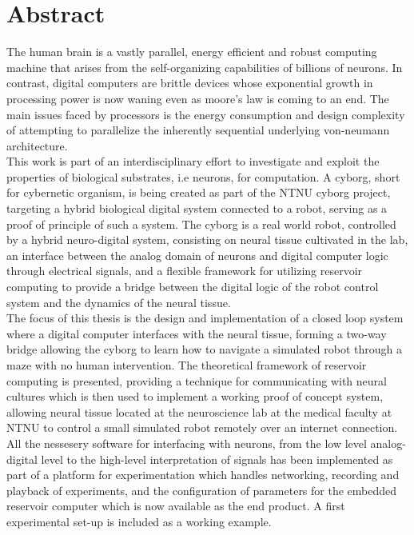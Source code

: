 \section*{\Huge Abstract}
The human brain is a vastly parallel, energy efficient and robust computing
machine that arises from the self-organizing capabilities of billions of neurons.
In contrast, digital computers are brittle devices whose exponential growth in
processing power is now waning even as moore's law is coming to an end.
The main issues faced by processors is the energy consumption and design
complexity of attempting to parallelize the inherently sequential underlying
von-neumann architecture.\\
This work is part of an interdisciplinary effort to investigate and exploit the
properties of biological substrates, i.e neurons, for computation.
%
A cyborg, short for cybernetic organism, is being created as part of the NTNU
cyborg project, targeting a hybrid biological digital system connected to a
robot, serving as a proof of principle of such a system.
%
The cyborg is a real world robot, controlled by a hybrid neuro-digital system,
consisting on neural tissue cultivated in the lab, an interface between the
analog domain of neurons and digital computer logic through electrical signals,
and a flexible framework for utilizing reservoir computing to provide a bridge
between the digital logic of the robot control system and the dynamics of the
neural tissue.\\
%
The focus of this thesis is the design and implementation of a closed loop
system where a digital computer interfaces with the neural tissue, forming a
two-way bridge allowing the cyborg to learn how to navigate a simulated robot
through a maze with no human intervention.
The theoretical framework of reservoir computing is presented, providing a technique
for communicating with neural cultures which is then used to implement a working
proof of concept system, allowing neural tissue located at the neuroscience lab
at the medical faculty at NTNU to control a small simulated robot remotely over an
internet connection.
All the nessesery software for interfacing with neurons, from the low level
analog-digital level to the high-level interpretation of signals has been
implemented as part of a platform for experimentation which handles networking,
recording and playback of experiments, and the configuration of parameters for
the embedded reservoir computer which is now available as the end product.
A first experimental set-up is included as a working example.
